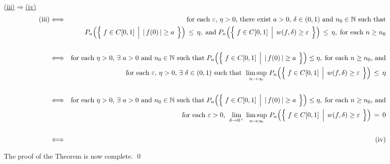 \vskip 0.5cm
\noindent
\underline{(iii)\;$\Longrightarrow$\;(iv)}
\vskip 0.2cm
\noindent
\begin{eqnarray*}
\textnormal{(iii)}
&\Longleftrightarrow&
	\textnormal{for each $\varepsilon,\,\eta > 0$, there exist $a > 0$, $\delta \in (0,1)$ and $n_{0} \in \N$ such that}
\\
&&
	P_{n}\!\left(\left\{\;
		f \in \Czo
		\;\left\vert\;\,
		\vert\,f(0)\,\vert \overset{{\color{white}.}}{\geq} a
		\right.
	\;\right\}\right)
	\,\leq\, \eta,
	\;\textnormal{and}\;
	P_{n}\!\left(\left\{\;
		f \in \Czo
		\;\left\vert\;\,
		w(f,\delta) \overset{{\color{white}.}}{\geq} \varepsilon
		\right.
	\;\right\}\right)
	\,\leq\, \eta,
	\;\textnormal{for each $n \geq n_{0}$}
\\ \\
&\Longleftrightarrow&
	\textnormal{for each $\eta > 0$, $\exists$ $a > 0$ and $n_{0} \in \N$ such that}\;
	P_{n}\!\left(\left\{\;
		f \in \Czo
		\;\left\vert\;\,
		\vert\,f(0)\,\vert \overset{{\color{white}.}}{\geq} a
		\right.
	\;\right\}\right)
	\leq \eta,
	\;\textnormal{for each $n \geq n_{0}$, and}
\\
&&
	\textnormal{for each $\varepsilon,\,\eta > 0$, $\exists$ $\delta \in (0,1)$ such that}\;\,
	\limsup_{n\rightarrow\infty}\,
	P_{n}\!\left(\left\{\;
		f \in \Czo
		\;\left\vert\;\,
		w(f,\delta) \overset{{\color{white}.}}{\geq} \varepsilon
		\right.
	\;\right\}\right)
	\,\leq\, \eta
\\ \\
&\Longleftrightarrow&
	\textnormal{for each $\eta > 0$, $\exists$ $a > 0$ and $n_{0} \in \N$ such that}\;
	P_{n}\!\left(\left\{\;
		f \in \Czo
		\;\left\vert\;\,
		\vert\,f(0)\,\vert \overset{{\color{white}.}}{\geq} a
		\right.
	\;\right\}\right)
	\leq \eta,
	\;\textnormal{for each $n \geq n_{0}$, and}
\\
&&
	\textnormal{for each $\varepsilon > 0$,}\;\,
	\lim_{\delta\rightarrow 0^{+}}\,\limsup_{n\rightarrow\infty}\,
	P_{n}\!\left(\left\{\;
		f \in \Czo
		\;\left\vert\;\,
		w(f,\delta) \overset{{\color{white}.}}{\geq} \varepsilon
		\right.
	\;\right\}\right)
	\,=\, 0
\\ \\
&\Longleftrightarrow& \textnormal{(iv)}
\end{eqnarray*}

\vskip 0.5cm
\noindent
The proof of the Theorem is now complete.
\qed

